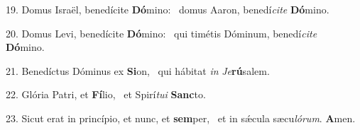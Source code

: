 19. Domus Israël, benedícite \textbf{Dó}mino: \ast\  domus Aaron, benedí\textit{ci}\textit{te} \textbf{Dó}mino.\

20. Domus Levi, benedícite \textbf{Dó}mino: \ast\  qui timétis Dóminum, benedí\textit{ci}\textit{te} \textbf{Dó}mino.\

21. Benedíctus Dóminus ex \textbf{Si}on, \ast\  qui hábitat \textit{in} \textit{Je}\textbf{rú}salem.\

22. Glória Patri, et \textbf{Fí}lio, \ast\  et Spirí\textit{tu}\textit{i} \textbf{Sanc}to.\

23. Sicut erat in princípio, et nunc, et \textbf{sem}per, \ast\  et in sǽcula sæcu\textit{ló}\textit{rum}. \textbf{A}men.\

